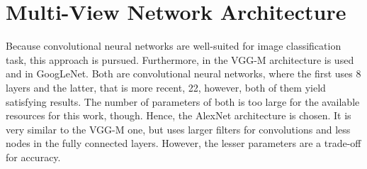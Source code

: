 \section{Multi-View Network Architecture}
\label{sec:methods-architecture}
Because convolutional neural networks are well-suited for image classification task, this approach is pursued.
Furthermore, in \cite{Su:2015:MCN:2919332.2919750} the VGG-M\cite{journals/corr/ChatfieldSVZ14} architecture is used and in \cite{Feng2018} GoogLeNet\cite{szegedy2015}.
Both are convolutional neural networks, where the first uses 8 layers and the latter, that is more recent, 22, however, both of them yield satisfying results.
The number of parameters of both is too large for the available resources for this work, though.
Hence, the AlexNet architecture\cite{Krizhevsky:2012:ICD:2999134.2999257} is chosen.
It is very similar to the VGG-M one, but uses larger filters for convolutions and less nodes in the fully connected layers.
However, the lesser parameters are a trade-off for accuracy.

